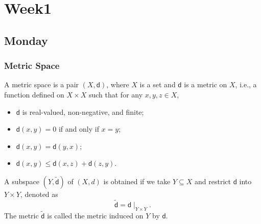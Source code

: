
\chapter{Week1}

\section{Monday}

\subsection{Metric Space}

\begin{definition}
A metric space is a pair $(X,\textsf{d})$,
where $X$ is a set and $\textsf{d}$ is a metric on $X$,
i.e., a function defined on $X\times X$ such that for any $x,y,z\in X$,
\begin{itemize}
\item
$\textsf{d}$ is real-valued, non-negative, and finite;
\item
$\textsf{d}(x,y)=0$ if and only if $x=y$;
\item
$\textsf{d}(x,y)=\textsf{d}(y,x)$;
\item
$\textsf{d}(x,y)\le \textsf{d}(x,z) + \textsf{d}(z,y)$.
\end{itemize}
\end{definition}

\begin{definition}[Subspace]
A subspace $(Y, \tilde{\textsf{d}})$ of $(X,d)$ is obtained if we take $Y\subseteq X$ and restrict $\textsf{d}$ into $Y\times Y$, denoted as
\[
\tilde{\textsf{d}}=\textsf{d}\mid_{Y\times Y}.
\]
The metric $\tilde{\textsf{d}}$ is called the metric induced on $Y$ by $\textsf{d}$.
\end{definition}

